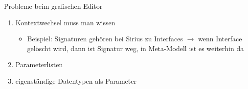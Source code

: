 \begin{frame}{Probleme beim grafischen Editor}
	\begin{enumerate}
		\item Kontextwechsel muss man wissen
		\begin{itemize}
			\item Beispiel: Signaturen gehören bei Sirius zu Interfaces $\rightarrow$ wenn Interface gelöscht wird, dann ist Signatur weg, in Meta-Modell ist es weiterhin da
		\end{itemize}
		\item Parameterlisten
		\item eigenständige Datentypen als Parameter
	\end{enumerate}
\end{frame}